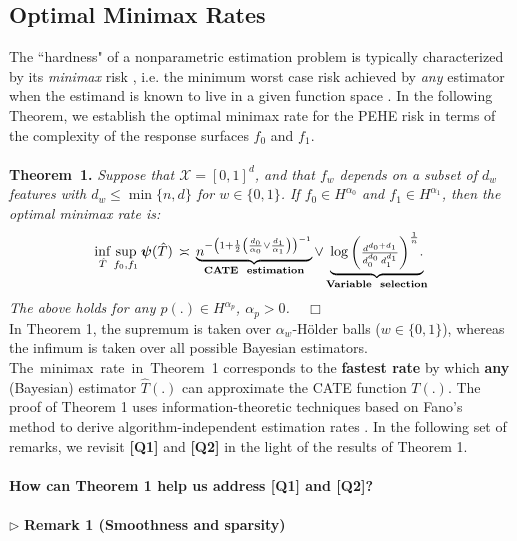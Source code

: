 \documentclass [PhD] {uclathes}
\begin{document}
\subsection{Optimal Minimax Rates}
\label{BMS2}
The ``hardness" of a nonparametric estimation problem is typically characterized by its \textit{minimax} risk \cite{stone1982optimal}, i.e. the minimum worst case risk achieved by \textit{any} estimator when the estimand is known to live in a given function space \cite{yang2015minimax}. In the following Theorem, we establish the optimal minimax rate for the PEHE risk in terms of the complexity of the response surfaces $f_0$ and $f_1$.\\ 
\\
\textbf{Theorem~1.} \textit{Suppose that $\mathcal{X} = [0,1]^d$, and that $f_w$ depends on a subset of $d_w$ features with $d_w \leq \min\{n,d\}$ for $w \in \{0,1\}$. If $f_0 \in H^{\alpha_0}$ and $f_1 \in H^{\alpha_1}$, then the optimal minimax rate is:} 
\begin{align}
\inf_{\hat{T}} \sup_{f_0,f_1} \mathbold{\psi}(\hat{T}) \,\asymp\, \underbrace{n^{-\left(1+\frac{1}{2}\left(\frac{d_0}{\alpha_0}\vee \frac{d_1}{\alpha_1}\right)\right)^{-1}}}_{\textbf{CATE\,\, estimation}} \vee \underbrace{\log \mbox{\footnotesize$\left(\frac{d^{d_0+d_1}}{d_0^{d_0}\, d_1^{d_1}}\right)^{\frac{1}{n}}$}.}_{\textbf{Variable\,\, selection}}\nonumber
\end{align} 
\textit{The above holds for any $p(.) \in H^{\alpha_p}$, $\alpha_p > 0$.} \,\,\, $\mathbf{\Box}$ \\

In Theorem 1, the supremum is taken over $\alpha_w$-H\"older balls ($w \in \{0,1\}$), whereas the infimum is taken over all possible Bayesian estimators. The~minimax~rate~in~Theorem~1 corresponds to the \textbf{fastest rate} by which \textbf{any} (Bayesian) estimator $\hat{T}(.)$ can approximate the CATE function $T(.)$. The proof of Theorem 1 uses information-theoretic techniques based on Fano's method to derive algorithm-independent estimation rates \cite{yang1999information}. In the following set of remarks, we revisit \textbf{[Q1]} and \textbf{[Q2]} in the light of the results of Theorem 1.\\ 
\\ 
\textbf{How can Theorem 1 help us address \mbox{\footnotesize \textbf{[Q1]}} and \mbox{\footnotesize \textbf{[Q2]}}?}\\
\\
$\triangleright$ \textbf{Remark 1 (Smoothness and sparsity)}
\end{document}
